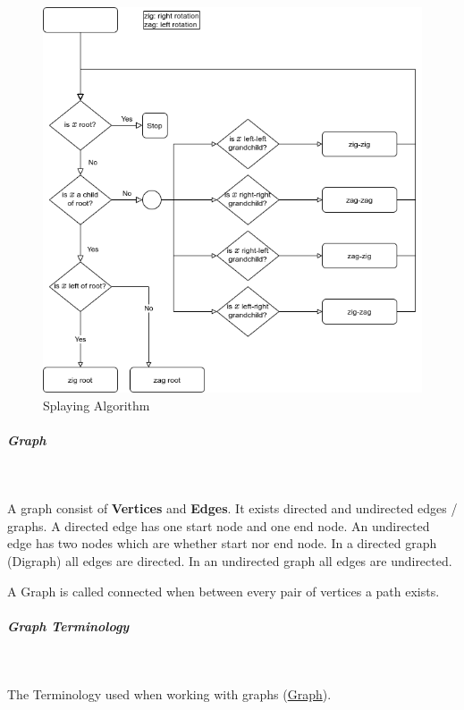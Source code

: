 \documentclass[11pt,twoside,twocolumn,landscape]{article}
\begin{document}
\begin{figure}[htbp]
\centering
\includegraphics[width=.9\linewidth]{img/splaying.png}
\caption{\label{fig:orgf3295e2}Splaying Algorithm}
\end{figure}

\subparagraph{Graph} \
\label{sec:orgf5931d5}

A graph consist of \textbf{Vertices} and \textbf{Edges}.
It exists directed and undirected edges / graphs.
A directed edge has one start node and one end node.
An undirected edge has two nodes which are whether start nor end node.
In a directed graph (Digraph) all edges are directed.
In an undirected graph all edges are undirected.


A Graph is called connected when between every pair of vertices a path exists.

\subparagraph{Graph Terminology} \
\label{sec:org0269bc4}

The Terminology used when working with graphs (\href{../../../roam/20220201163000-graph.org}{Graph}).
\end{document}
